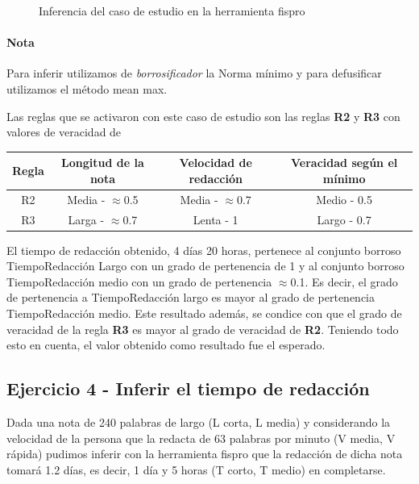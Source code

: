 \documentclass{article}
\begin{document}
\begin{figure}[H]
	\centering
	\caption{Inferencia del caso de estudio en la herramienta fispro}
\end{figure}

\paragraph{Nota} Para inferir utilizamos de \textit{borrosificador} la Norma mínimo y para defusificar utilizamos el método mean max.

\vspace{3mm}
Las reglas que se activaron con este caso de estudio son las reglas \textbf{R2} y \textbf{R3} con valores de veracidad de

\begin{table}[H]
	\centering
	\begin{tabular}{c|c c|c}
		Regla&Longitud de la nota&Velocidad de redacción&Veracidad según el mínimo\\
		\hline
		R2&Media - $\approx$0.5&Media - $\approx$0.7&Medio - 0.5\\
		R3&Larga - $\approx$0.7&Lenta - 1&Largo - 0.7\\
	\end{tabular}
\end{table}

El tiempo de redacción obtenido, 4 días 20 horas, pertenece al conjunto borroso TiempoRedacción Largo con un grado de pertenencia de 1 y al conjunto borroso TiempoRedacción medio con un grado de pertenencia $\approx$0.1. Es decir, el grado de pertenencia a TiempoRedacción largo es mayor al grado de pertenencia TiempoRedacción medio. Este resultado además, se condice con que el grado de veracidad de la regla \textbf{R3} es mayor al grado de veracidad de \textbf{R2}. Teniendo todo esto en cuenta, el valor obtenido como resultado fue el esperado.

\pagebreak
\subsection*{Ejercicio 4 - Inferir el tiempo de redacción}

Dada una nota de 240 palabras de largo (L corta, L media) y considerando la velocidad de la persona que la redacta de 63 palabras por minuto (V media, V rápida) pudimos inferir con la herramienta fispro que la redacción de dicha nota tomará 1.2 días, es decir, 1 día y 5 horas (T corto, T medio) en completarse.
\end{document}
